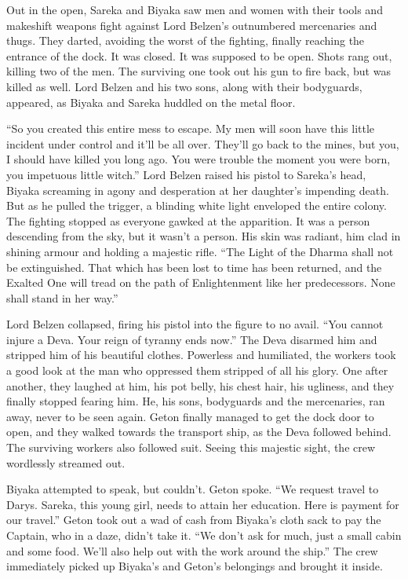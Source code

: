 Out in the open, Sareka and Biyaka saw men and women with their tools and makeshift weapons fight against Lord Belzen’s outnumbered mercenaries and thugs. They darted, avoiding the worst of the fighting, finally reaching the entrance of the dock. It was closed. It was supposed to be open. Shots rang out, killing two of the men. The surviving one took out his gun to fire back, but was killed as well. Lord Belzen and his two sons, along with their bodyguards, appeared, as Biyaka and Sareka huddled on the metal floor.

“So you created this entire mess to escape. My men will soon have this little incident under control and it’ll be all over. They’ll go back to the mines, but you, I should have killed you long ago. You were trouble the moment you were born, you impetuous little witch.” Lord Belzen raised his pistol to Sareka’s head, Biyaka screaming in agony and desperation at her daughter’s impending death. But as he pulled the trigger, a blinding white light enveloped the entire colony. The fighting stopped as everyone gawked at the apparition. It was a person descending from the sky, but it wasn’t a person. His skin was radiant, him clad in shining armour and holding a majestic rifle. “The Light of the Dharma shall not be extinguished. That which has been lost to time has been returned, and the Exalted One will tread on the path of Enlightenment like her predecessors. None shall stand in her way.”

Lord Belzen collapsed, firing his pistol into the figure to no avail. “You cannot injure a Deva. Your reign of tyranny ends now.” The Deva disarmed him and stripped him of his beautiful clothes. Powerless and humiliated, the workers took a good look at the man who oppressed them stripped of all his glory. One after another, they laughed at him, his pot belly, his chest hair, his ugliness, and they finally stopped fearing him. He, his sons, bodyguards and the mercenaries, ran away, never to be seen again. Geton finally managed to get the dock door to open, and they walked towards the transport ship, as the Deva followed behind. The surviving workers also followed suit. Seeing this majestic sight, the crew wordlessly streamed out.

Biyaka attempted to speak, but couldn’t. Geton spoke. “We request travel to Darys. Sareka, this young girl, needs to attain her education. Here is payment for our travel.” Geton took out a wad of cash from Biyaka’s cloth sack to pay the Captain, who in a daze, didn’t take it. “We don’t ask for much, just a small cabin and some food. We’ll also help out with the work around the ship.” The crew immediately picked up Biyaka’s and Geton’s belongings and brought it inside.

